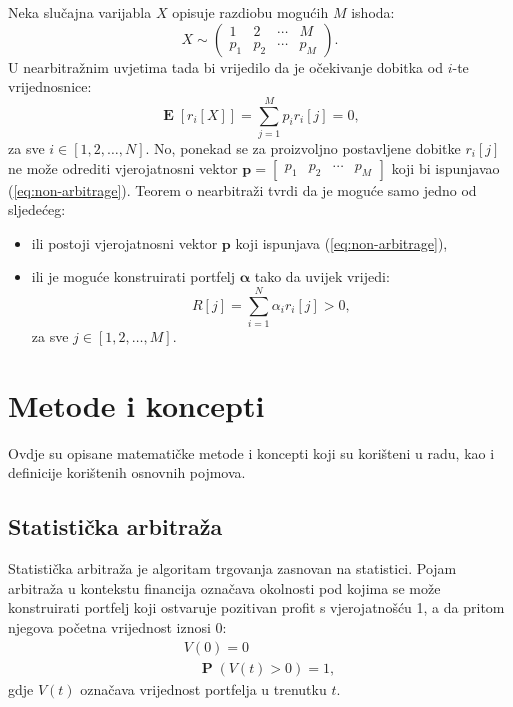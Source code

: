 \documentclass[lmodern, utf8, diplomski, numeric]{fer}
\newcommand{\matr}[1]{\mathbold{#1}}
\newcommand{\E}[1]{\operatorname{\mathbf{E}}\q[#1\w]}
\newcommand{\prob}[1]{\operatorname{\mathbf{P}}\q(#1\w)}
\newcommand{\q}{\left}
\newcommand{\w}{\right}
\begin{document}
  Neka slučajna varijabla $X$ opisuje razdiobu mogućih $M$ ishoda:
  \begin{equation*}
    X \sim \begin{pmatrix} 1 & 2 & \cdots & M \\ p_1 & p_2 & \cdots & p_M \end{pmatrix}.
  \end{equation*}
  U nearbitražnim uvjetima tada bi vrijedilo da je očekivanje dobitka od $i$-te vrijednosnice:
  \begin{equation}
  \label{eq:non-arbitrage}
  \E{r_i\q[X\w]} = \sum_{j=1}^{M} p_i r_i\q[j\w] = 0,
  \end{equation}
  za sve $i \in \q[1, 2, \ldots, N\w]$.
  No, ponekad se za proizvoljno postavljene dobitke $r_i\q[j\w]$ ne može odrediti vjerojatnosni vektor $\matr{p} = \begin{bmatrix} p_1 & p_2 & \cdots & p_M \end{bmatrix}$ koji bi ispunjavao (\ref{eq:non-arbitrage}).
  Teorem o nearbitraži tvrdi da je moguće samo jedno od sljedećeg:
  \begin{itemize}
    \item ili postoji vjerojatnosni vektor $\matr p$ koji ispunjava (\ref{eq:non-arbitrage}),
    \item ili je moguće konstruirati portfelj $\matr \alpha$ tako da uvijek vrijedi:
    \begin{equation}
      R\q[j\w] = \sum_{i = 1}^{N} \alpha_i r_i\q[j\w] > 0,
    \end{equation}
    za sve $j \in \q[1, 2, \ldots, M\w]$.
  \end{itemize}

  \chapter{Metode i koncepti}
  Ovdje su opisane matematičke metode i koncepti koji su korišteni u radu, kao i definicije korištenih osnovnih pojmova.
  
  \section{Statistička arbitraža}
  Statistička arbitraža  je algoritam trgovanja zasnovan na statistici.
  Pojam arbitraža u kontekstu financija označava okolnosti pod kojima se može konstruirati portfelj koji ostvaruje pozitivan profit s vjerojatnošću 1, a da pritom njegova početna vrijednost iznosi 0:
  \begin{equation}
  \begin{gathered}
  \label{eq:statarb}
  V\q(0\w) = 0\\
  \quad \prob{V\q(t\w) > 0} = 1,
  \end{gathered}
  \end{equation}
  gdje $V\q(t\w)$ označava vrijednost portfelja u trenutku $t$.
  
\end{document}
